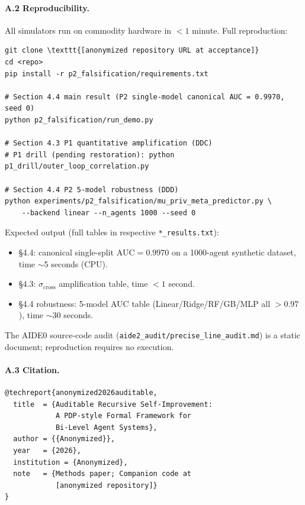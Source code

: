 \paragraph{A.2 Reproducibility.}
All simulators run on commodity hardware in $<1$ minute. Full reproduction:

\begin{verbatim}
git clone \texttt{[anonymized repository URL at acceptance]}
cd <repo>
pip install -r p2_falsification/requirements.txt

# Section 4.4 main result (P2 single-model canonical AUC = 0.9970, seed 0)
python p2_falsification/run_demo.py

# Section 4.3 P1 quantitative amplification (DDC)
# P1 drill (pending restoration): python p1_drill/outer_loop_correlation.py

# Section 4.4 P2 5-model robustness (DDD)
python experiments/p2_falsification/mu_priv_meta_predictor.py \
    --backend linear --n_agents 1000 --seed 0
\end{verbatim}

Expected output (full tables in respective \texttt{*\_results.txt}):
\begin{itemize}
    \item \S4.4: canonical single-split $\text{AUC} = 0.9970$ on a 1000-agent synthetic dataset, time $\sim$5 seconds (CPU).
    \item \S4.3: $\sigma_{\text{cross}}$ amplification table, time $<1$ second.
    \item \S4.4 robustness: 5-model AUC table (Linear/Ridge/RF/GB/MLP all $> 0.97$), time $\sim$30 seconds.
\end{itemize}

The AIDE0 source-code audit (\texttt{aide2\_audit/precise\_line\_audit.md}) is a static document; reproduction requires no execution.

\paragraph{A.3 Citation.}
\begin{verbatim}
@techreport{anonymized2026auditable,
  title  = {Auditable Recursive Self-Improvement:
            A PDP-style Formal Framework for
            Bi-Level Agent Systems},
  author = {{Anonymized}},
  year   = {2026},
  institution = {Anonymized},
  note   = {Methods paper; Companion code at
            [anonymized repository]}
}
\end{verbatim}


